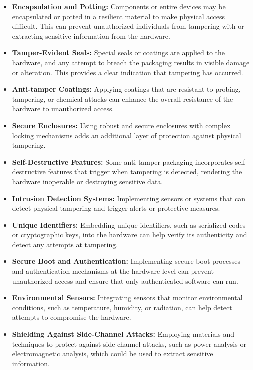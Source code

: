 \begin{itemize}
	\item \textbf{Encapsulation and Potting:} Components or entire devices may be encapsulated or potted in a resilient material to make physical access difficult. This can prevent unauthorized individuals from tampering with or extracting sensitive information from the hardware.
	\item \textbf{Tamper-Evident Seals:} Special seals or coatings are applied to the hardware, and any attempt to breach the packaging results in visible damage or alteration. This provides a clear indication that tampering has occurred.
	\item \textbf{Anti-tamper Coatings:} Applying coatings that are resistant to probing, tampering, or chemical attacks can enhance the overall resistance of the hardware to unauthorized access.
	\item \textbf{Secure Enclosures:} Using robust and secure enclosures with complex locking mechanisms adds an additional layer of protection against physical tampering.
	\item \textbf{Self-Destructive Features:} Some anti-tamper packaging incorporates self-destructive features that trigger when tampering is detected, rendering the hardware inoperable or destroying sensitive data.
	\item \textbf{Intrusion Detection Systems:} Implementing sensors or systems that can detect physical tampering and trigger alerts or protective measures.
	\item \textbf{Unique Identifiers:} Embedding unique identifiers, such as serialized codes or cryptographic keys, into the hardware can help verify its authenticity and detect any attempts at tampering.
	\item \textbf{Secure Boot and Authentication:} Implementing secure boot processes and authentication mechanisms at the hardware level can prevent unauthorized access and ensure that only authenticated software can run.
	\item \textbf{Environmental Sensors:} Integrating sensors that monitor environmental conditions, such as temperature, humidity, or radiation, can help detect attempts to compromise the hardware.
	\item \textbf{Shielding Against Side-Channel Attacks:} Employing materials and techniques to protect against side-channel attacks, such as power analysis or electromagnetic analysis, which could be used to extract sensitive information.
\end{itemize}
